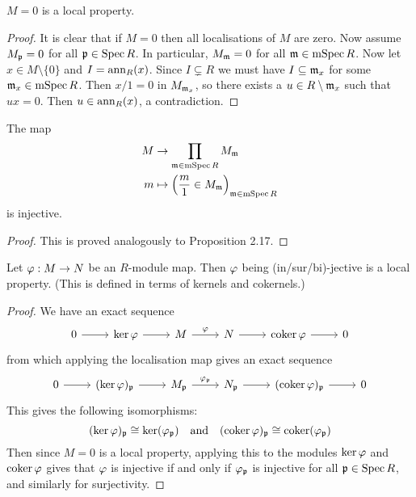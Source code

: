 \begin{prop}
  $M=0$ is a local property.
\end{prop}

\begin{proof}
  It is clear that if $M=0$ then all localisations of $M$ are zero.
  Now assume $M_{\mathfrak{p}}=0$ for all $\mathfrak{p} \in \operatorname{Spec} R$.
  In particular, $M_{\mathfrak{m}}=0$ for all $\mathfrak{m} \in \operatorname{mSpec} R$.
  Now let $x \in M \setminus \{0\}$ and $I = \operatorname{ann}_R(x)$.
  Since $I \subsetneq R$ we must have $I \subseteq \mathfrak{m}_x$ for some $\mathfrak{m}_x \in \operatorname{mSpec} R$.
  Then $x/1=0$ in $M_{\mathfrak{m}_x}$, so there exists a $u \in R \setminus \mathfrak{m}_x$ such that $ux=0$.
  Then $u \in \operatorname{ann}_R(x)$, a contradiction.
\end{proof}

\begin{cor}[2.18]
  The map
  \begin{align*}
    M &\to \prod_{\mathfrak{m} \in \operatorname{mSpec} R} M_{\mathfrak{m}} \\
    m &\mapsto \left( \frac{m}{1} \in M_{\mathfrak{m}} \right)_{\mathfrak{m} \in \operatorname{mSpec} R}
  \end{align*}
  is injective.
\end{cor}

\begin{proof}
  This is proved analogously to Proposition 2.17.
\end{proof}

\begin{prop}[2.19]
  Let $\varphi: M \to N$ be an $R$-module map.
  Then $\varphi$ being (in/sur/bi)-jective is a local property.
  (This is defined in terms of kernels and cokernels.)
\end{prop}

\begin{proof}
  We have an exact sequence
  \begin{equation*}
    \begin{tikzcd}
      0 \ar[r] & \ker\ph \ar[r] & M \ar[r, "\ph"] & N \ar[r] & \coker\ph \ar[r] & 0
    \end{tikzcd}
  \end{equation*}
  from which applying the localisation map gives an exact sequence
  \begin{equation*}
    \begin{tikzcd}
      0 \ar[r] & (\ker\ph)_\kp \ar[r] & M_\kp \ar[r, "\ph_\kp"] & N_\kp \ar[r] & (\coker\ph)_\kp \ar[r] & 0
    \end{tikzcd}
  \end{equation*}
  This gives the following isomorphisms:
  \[(\ker\varphi)_{\mathfrak{p}} \cong \ker(\varphi_{\mathfrak{p}}) \quad\text{and}\quad (\operatorname{coker}\varphi)_{\mathfrak{p}} \cong \operatorname{coker}(\varphi_{\mathfrak{p}})\]
  Then since $M=0$ is a local property, applying this to the modules $\ker\varphi$ and $\operatorname{coker}\varphi$ gives that $\varphi$ is injective if and only if $\varphi_{\mathfrak{p}}$ is injective for all $\mathfrak{p} \in \operatorname{Spec} R$, and similarly for surjectivity.
\end{proof}

